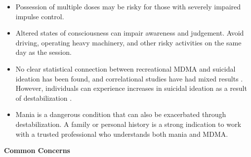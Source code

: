 \documentclass[12pt,letterpaper]{article}
\begin{document}
\begin{itemize}
    \item Possession of multiple doses may be risky for those with severely impaired impulse control.
    \item Altered states of consciousness can impair awareness and judgement. Avoid driving, operating heavy machinery, and other risky activities on the same day as the session.
    \item No clear statistical connection between recreational MDMA and suicidal ideation has been found, and correlational studies have had mixed results \cite{jonesSuicideAdults,jonesSuicideAdolescents,kimSuicide}. However, individuals can experience increases in suicidal ideation as a result of destabilization \cite{studyingHarms}.  
    \item Mania is a dangerous condition that can also be exacerbated through destabilization. A family or personal history is a strong indication to work with a trusted professional who understands both mania and MDMA. 
\end{itemize}
\noindent \textbf{Common Concerns}
\end{document}
